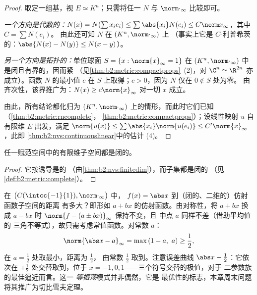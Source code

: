 \begin{proof}
取定一组基，视 $E \simeq K^n$；只需将任一
 $N$ 与 $\norm\cdot_\infty$ 比较即可。

\emph{一个方向是代数的：}$N(x) = N(\sum x_i e_i) \leq
\sum \abs{x_i} N(e_i) \leq C \norm x_\infty$，其中 $C = \sum N(e_i)$。
由此还可知 $N$ 在 $(K^n, \norm\cdot_\infty)$ 上
（事实上它是 $C$-利普希茨的：$\abs{N(x) - N(y)} \leq N(x - y)$）。

\emph{另一个方向是拓扑的：}单位球面 $S = \{x :
\norm{x}_\infty = 1\}$ 在 $(K^n,
\norm\cdot_\infty)$ 中是闭且有界的，因而紧
（见\cref{thm:b2:metric:compactprops}~(2)，对 $\C^n \simeq
\R^{2n}$ 亦成立）。函数 $N$ 的最小值 $c$ 在
$S$ 上取得；$c > 0$，因为 $N$ 仅在 $0 \notin S$ 处为零。
由齐次性，该界推广为：$N(x) \geq c \norm{x}_\infty$ 对一切 $x$ 成立。

由此，所有结论都化归为 $(K^n,
\norm\cdot_\infty)$ 上的情形，而此时它们已知
（\cref{thm:b2:metric:rncomplete}，
\cref{thm:b2:metric:compactprops}）；设线性映射 $u$ 自
有限维 $E$ 出发，满足 $\norm{u(x)} \leq \sum\abs{x_i}
\norm{u(e_i)} \leq C'\norm{x}_\infty$，此即
\cref{thm:b2:nvs:continuouslinear}中的估计 (4)。
\end{proof}

\begin{corollary}\label{cor:b2:nvs:closedsubspace}
任一赋范空间中的有限维子空间都是闭的。
\end{corollary}

\begin{proof}
它按诱导是的
（由\cref{thm:b2:nvs:finitedim}），而子集都是闭的
（见\cref{def:b2:metric:complete}）。
\end{proof}

\begin{example}[借助对称性计算最佳逼近]\label{ex:b2:nvs:bestaffine}
在 $\bigl(C(\intcc{-1}{1}), \norm\cdot_\infty\bigr)$ 中，
$f(x) = \abs x$ 到（闭的、二维的）仿射函数子空间的距离
有多大？即形如 $a + bx$ 的仿射函数。由对称性，将 $a + bx$ 换成
$a - bx$ 时 $\norm{f - (a \pm bx)}_\infty$ 保持不变，且
中点 $a$ 同样不差（借助平均值的
三角不等式），故只需考虑常值函数。对常数
$a$：
\[
\norm{\abs x - a}_\infty = \max\,(1 - a,\ a)
\geq \frac12 ,
\]
在 $a = \frac12$ 处取最小，距离为 $\frac12$，
由常数 $\frac12$ 取到。注意误差曲线 $\abs x -
\frac12$：它依次在 $\pm\frac12$ 处交替取到，位于 $x = -1, 0,
1$——三个符号交替的极值，对于
二参数族的最佳逼近而言。这一
\emph{等振荡}模式并非偶然，它是
最优性的标志，本章周末问题
将其推广为切比雪夫定理。
\end{example}

